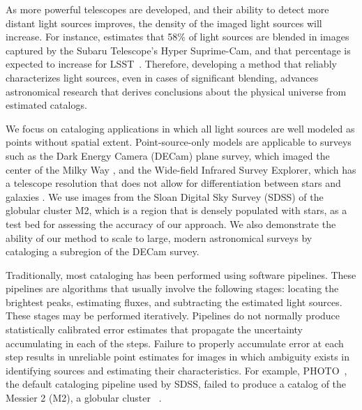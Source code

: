 As more powerful telescopes are developed, and their ability to detect more distant light sources improves,
the density of the imaged light sources will increase.
For instance, \cite{bosch2018hyper} estimates that 58\% of light sources are blended in images captured by the
Subaru Telescope’s Hyper Suprime-Cam, and that percentage is expected to increase for LSST~\citep{sanchez2021effects}.
Therefore, developing a method that reliably characterizes light sources, even in cases of significant blending,
advances astronomical research that derives conclusions about the physical universe from estimated catalogs.

We focus on cataloging applications in which all light sources are well modeled as points without spatial extent.
Point-source-only models are applicable to surveys such as the Dark Energy Camera (DECam) plane survey,
which imaged the center of the  Milky Way \citep{Schlafly_2018_DECam}, and
the Wide-field Infrared Survey Explorer,
which has a  telescope resolution that does not allow for differentiation between stars and galaxies \citep{Wright_2010_WISESurvey}.
We use images from the Sloan Digital Sky Survey (SDSS) of the globular cluster M2, which is a region that is densely populated with stars,
as a test bed for assessing the accuracy of our approach.
We also demonstrate the ability of our method to scale to large, modern astronomical surveys
by cataloging a subregion of the DECam survey.

\bigbreak


Traditionally, most cataloging has been performed using software pipelines.
These pipelines are algorithms that usually involve the following stages: locating the brightest peaks, estimating fluxes, and subtracting the estimated light sources.
These stages may be performed iteratively.
Pipelines do not normally produce statistically calibrated error estimates that propagate
the uncertainty accumulating in each of the steps.
Failure to properly accumulate error at each step results in unreliable point estimates
for images in which ambiguity exists in identifying sources and estimating their characteristics.
For example, PHOTO~\citep{lupton2001sdss}, the default cataloging pipeline used by SDSS, failed to produce a catalog of the Messier 2 (M2), a globular cluster ~\citep{Portillo_2017}.

